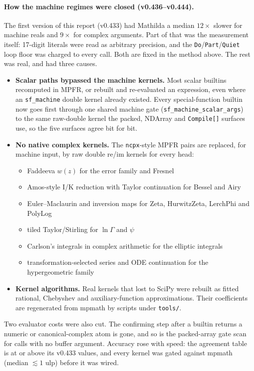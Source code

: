 \documentclass[11pt]{article}
\newcommand{\mcode}[1]{\texttt{\textcolor{mCode}{#1}}}
\begin{document}
\paragraph{How the machine regimes were closed (v0.436--v0.444).} The first version of this
report (v0.433) had Mathilda a median $12\times$ slower for machine reals and $9\times$ for
complex arguments. Part of that was the measurement itself: 17-digit literals were read as
arbitrary precision, and the \mcode{Do}/\mcode{Part}/\mcode{Quiet} loop floor was charged to
every call. Both are fixed in the method above. The rest was real, and had three causes.
\begin{itemize}
\item \textbf{Scalar paths bypassed the machine kernels.} Most scalar builtins recomputed in
  MPFR, or rebuilt and re-evaluated an expression, even where an \mcode{sf\_machine}
  double kernel already existed. Every special-function builtin now goes first through one
  shared machine gate (\mcode{sf\_machine\_scalar\_args}) to the same raw-double kernel the
  packed, NDArray and \mcode{Compile[]} surfaces use, so the five surfaces agree bit for bit.
\item \textbf{No native complex kernels.} The \mcode{ncpx}-style MPFR pairs are replaced, for
  machine input, by raw double re/im kernels for every head:
  \begin{itemize}
  \item Faddeeva $w(z)$ for the error family and Fresnel
  \item Amos-style I/K reduction with Taylor continuation for Bessel and Airy
  \item Euler--Maclaurin and inversion maps for Zeta, HurwitzZeta, LerchPhi and PolyLog
  \item tiled Taylor/Stirling for $\ln\Gamma$ and $\psi$
  \item Carlson's integrals in complex arithmetic for the elliptic integrals
  \item transformation-selected series and ODE continuation for the hypergeometric family
  \end{itemize}
\item \textbf{Kernel algorithms.} Real kernels that lost to SciPy were rebuilt as fitted
  rational, Chebyshev and auxiliary-function approximations. Their coefficients are
  regenerated from mpmath by scripts under \mcode{tools/}.
\end{itemize}
Two evaluator costs were also cut. The confirming step after a builtin returns a numeric or
canonical-complex atom is gone, and so is the packed-array gate scan for calls with no
buffer argument. Accuracy rose with speed: the agreement table is at or above its v0.433
values, and every kernel was gated against mpmath (median $\lesssim 1$ ulp) before it was
wired.
\end{document}
